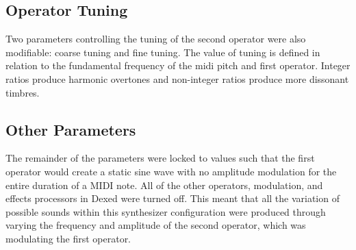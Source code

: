 \subsection{Operator Tuning}
Two parameters controlling the tuning of the second operator were also modifiable: coarse tuning and fine tuning. The value of tuning is defined in relation to the fundamental frequency of the midi pitch and first operator. Integer ratios produce harmonic overtones and non-integer ratios produce more dissonant timbres.

\subsection{Other Parameters}
The remainder of the parameters were locked to values such that the first operator would create a static sine wave with no amplitude modulation for the entire duration of a MIDI note. All of the other operators, modulation, and effects processors in Dexed were turned off. This meant that all the variation of possible sounds within this synthesizer configuration were produced through varying the frequency and amplitude of the second operator, which was modulating the first operator. %

%

